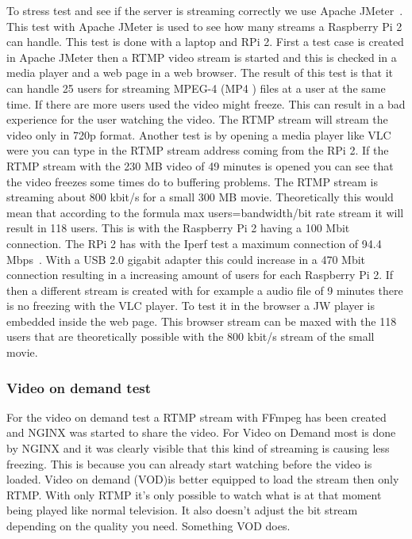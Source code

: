 \documentclass{sig-alternate-br}
\begin{document}
To stress test and see if the server is streaming correctly we use Apache JMeter~\cite{jmeter}. This test with Apache JMeter is used to see how many streams a Raspberry Pi 2 can handle. This test is done with a laptop and RPi 2. First a test case is created in Apache JMeter then a RTMP video stream is started and this is checked in a media player and a web page in a web browser. The result of this test is that it can handle 25 users for streaming MPEG-4 (MP4 ) files at a user at the same time. If there are more users used the video might freeze. This can result in a bad experience for the user watching the video. The RTMP stream will stream the video only in 720p format. Another test is by opening a media player like VLC were you can type in the RTMP stream address coming from the RPi 2. If the RTMP stream with the 230 MB video of 49 minutes is opened you can see that the video freezes some times do to buffering problems. \newline
The RTMP stream is streaming about 800 kbit/s for a small 300 MB movie. Theoretically this would mean that according to the formula max users=bandwidth/bit rate stream it will result in 118 users. This is with the Raspberry Pi 2 having a 100 Mbit connection.  The RPi 2 has with the Iperf test a maximum connection of  94.4 Mbps~\cite{ipref}. With a USB 2.0 gigabit adapter this could increase in a 470 Mbit connection resulting in a increasing amount of users for each Raspberry Pi 2. \newline
If then a different stream is created with for example a audio file of 9 minutes there is no freezing with the VLC player. To test it in the browser a JW player is embedded inside the web page. This browser stream can be maxed with the 118 users that are theoretically possible with the 800 kbit/s stream of the small movie. 
 

\subsubsection{Video on demand test}
For the video on demand test a RTMP stream with FFmpeg has been created and NGINX was started to share the video. 
For Video on Demand most is done by NGINX and it was clearly visible that this kind of streaming is causing less freezing. This is because you can already start watching before the video is loaded. Video on demand (VOD)is better equipped to load the stream then only RTMP. With only RTMP it's only possible to watch what is at that moment being played like normal television. It also doesn't adjust the bit stream depending on the quality you need. Something VOD does. 
\end{document}
